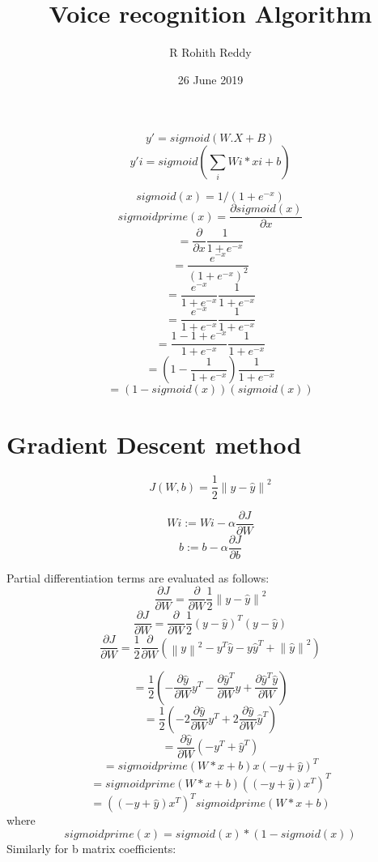 \documentclass[12pt,letterpaper]{article}
\title{Voice recognition Algorithm}
\author{R Rohith Reddy}
\date{26 June 2019}
\newcommand{\norm}[1]{\left\lVert#1\right\rVert}
\newcommand{\<}{\langle}
\renewcommand{\>}{\rangle}
\theoremstyle{definition}
\begin{document}
\maketitle




$$y'= sigmoid(W.X + B)$$ 
$$y'i=sigmoid(\sum_{i} Wi*xi + b)$$


$$sigmoid(x)=1/(1+e^{-x})$$ 
$$sigmoidprime(x)=\frac{\partial sigmoid(x)}{\partial x}$$
$$=\frac{\partial }{\partial x}\frac{1}{1+e^{-x}}$$
$$=\frac{e^{-x}}{(1+e^{-x})^2}$$
$$=\frac{e^{-x}}{1+e^{-x}}\frac{1}{1+e^{-x}}$$
$$=\frac{e^{-x}}{1+e^{-x}}\frac{1}{1+e^{-x}}$$
$$=\frac{1-1+e^{-x}}{1+e^{-x}}\frac{1}{1+e^{-x}}$$
$$=(1-\frac{1}{1+e^{-x}})\frac{1}{1+e^{-x}}$$
$$=(1-sigmoid(x))(sigmoid(x))$$

\section{Gradient Descent method}

$$J(W,b)=\frac{1}{2}\norm{y-\hat y}^2$$

$$Wi:=Wi-\alpha\frac{\partial J}{\partial W}$$
$$b:=b-\alpha\frac{\partial J}{\partial b}$$


Partial differentiation terms are evaluated as follows:\\
$$\frac{\partial J}{\partial W}=\frac{\partial  }{\partial W}\frac{1}{2}\norm{y-\hat y}^2$$
$$\frac{\partial J}{\partial W}=\frac{\partial  }{\partial W}\frac{1}{2}{(y-\hat y)^T(y-\hat y)}$$
$$\frac{\partial J}{\partial W}=\frac{1}{2}\frac{\partial  }{\partial W}{(\norm{y}^2-y^T\hat y-y\hat y^T+\norm{\hat y}^2)}$$
\noindent{}
\noindent{}

$$=\frac{1}{2}(-\frac{\partial \hat y}{\partial W}y^T-\frac{\partial \hat y^T}{\partial W}y+\frac{\partial \hat y^T\hat y }{\partial W})$$
$$=\frac{1}{2}(-2\frac{\partial \hat y}{\partial W}y^T+2\frac{\partial \hat y }{\partial W}\hat y^T)$$
$$=\frac{\partial \hat y}{\partial W}(-y^T+\hat y^T)$$
$$=sigmoidprime(W*x + b)x(-y+\hat y)^T$$
$$=sigmoidprime(W*x + b)((-y+\hat y)x^T)^T$$
$$=((-y+\hat y)x^T)^Tsigmoidprime(W*x + b)$$
where 
$$sigmoidprime(x)=sigmoid(x)*(1-sigmoid(x))$$Similarly for b matrix coefficients:
 
\end{document}
